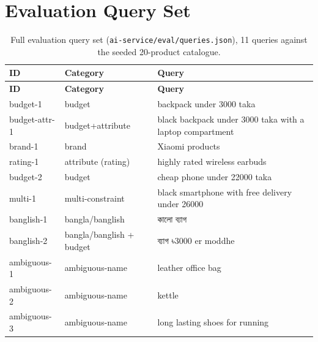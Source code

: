 \documentclass[12pt,a4paper]{report}
\newcommand{\bn}[1]{{\bengalifont #1}}
\begin{document}
\chapter{Evaluation Query Set}
\begin{longtable}{p{2.6cm}p{3.6cm}p{6.4cm}}
\caption{Full evaluation query set (\texttt{ai-service/eval/queries.json}), 11 queries against the seeded
20-product catalogue.} \\
\toprule
\textbf{ID} & \textbf{Category} & \textbf{Query} \\
\midrule
\endfirsthead
\toprule
\textbf{ID} & \textbf{Category} & \textbf{Query} \\
\midrule
\endhead
budget-1 & budget & backpack under 3000 taka \\
budget-attr-1 & budget+attribute & black backpack under 3000 taka with a laptop compartment \\
brand-1 & brand & Xiaomi products \\
rating-1 & attribute (rating) & highly rated wireless earbuds \\
budget-2 & budget & cheap phone under 22000 taka \\
multi-1 & multi-constraint & black smartphone with free delivery under 26000 \\
banglish-1 & bangla/banglish & \bn{কালো ব্যাগ} \\
banglish-2 & bangla/banglish + budget & \bn{ব্যাগ ৳3000} er moddhe \\
ambiguous-1 & ambiguous-name & leather office bag \\
ambiguous-2 & ambiguous-name & kettle \\
ambiguous-3 & ambiguous-name & long lasting shoes for running \\
\bottomrule
\end{longtable}
\end{document}
